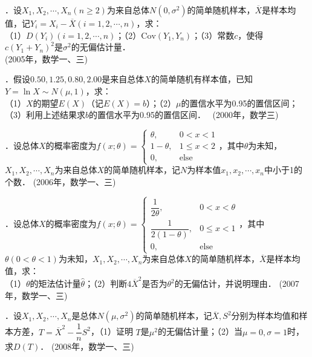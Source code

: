 \documentclass{ctexart}
\newcommand{\shortlabel}[1]
{
	\hfill
	{\small(#1)}\ignorespaces
}
\newcommand{\longlabel}[1]
{
	\\
	\hspace*{0mm}
	\hfill
	{\small(#1)}\ignorespaces
}
\newenvironment{answer}
{
	\begin{mdframed}[backgroundcolor=gray!40, hidealllines=true, skipabove=0pt, skipbelow=0pt]
	\noindent\ignorespaces
}
{  
	\end{mdframed}
}
\begin{document}
\begin{answer}
\end{answer}
7．设$X_1,X_2,\cdots,X_n(n\ge 2)$为来自总体$N(0,\sigma^2)$的简单随机样本，$\overline{X}$是样本均值，记$Y_i=X_i-\overline{X}(i=1,2,\cdots,n)$，求：\\
（1）$D(Y_i)(i=1,2,\cdots,n)$；（2）$\mathrm{Cov}(Y_1,Y_n)$；（3）常数$c$，使得$c(Y_1+Y_n)^2$是$\sigma^2$的无偏估计量．　\longlabel{2005年，数学一、三}
\par\medskip
\begin{answer}
\end{answer}
8．假设$0.50,1.25,0.80,2.00$是来自总体$X$的简单随机有样本值，已知$Y=\ln X\sim N(\mu,1)$，求：\\
（1）$X$的期望$E(X)$（记$E(X)=b$）；（2）$\mu$的置信水平为0.95的置信区间；（3）利用上述结果求$b$的置信水平为0.95的置信区间．　\shortlabel{2000年，数学三}\par\medskip
\begin{answer}
\end{answer}
9．设总体$X$的概率密度为$f(x;\theta)=
\begin{cases}
\theta,&0<x<1\\
1-\theta,&1\le x<2\\
0,&\text{else}
\end{cases}$，其中$\theta$为未知，$X_1,X_2,\cdots,X_n$为来自总体$X$的简单随机样本，记$N$为样本值$x_1,x_2,\cdots,x_n$中小于1的个数．\shortlabel{2006年，数学一、三}\par\medskip
\begin{answer}
\end{answer}
10．设总体$X$的概率密度为$f(x;\theta)=
\begin{cases}
\dfrac{1}{2\theta},&0<x<\theta\\
\dfrac{1}{2(1-\theta)},&0\le x<1\\
0,&\text{else}
\end{cases}$，其中$\theta(0<\theta<1)$为未知，$X_1,X_2,\cdots,X_n$为来自总体$X$的简单随机样本，$\overline{X}$是样本均值，求：\\
（1）$\theta$的矩法估计量$\hat{\theta}$；（2）判断$4\overline{X}^2$是否为$\theta^2$的无偏估计，并说明理由．\shortlabel{2007年，数学一、三}
\par\medskip
\begin{answer}
\end{answer}
11．设$X_1, X_2, \cdots, X_n$是总体$N(\mu, \sigma^2)$的简单随机样本，记$\overline{X}, S^2$分别为样本均值和样本方差，$T = \overline{X}^2 - \dfrac{1}{n} S^2$，（1）证明 $T$是$\mu^2$的无偏估计量；（2）当$\mu=0, \sigma=1$时，求$D(T)$．\shortlabel{2008年，数学一、三}
\end{document}
